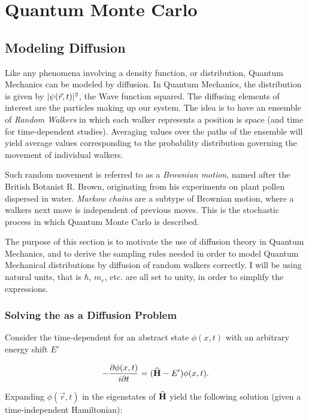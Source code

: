 \chapter{Quantum Monte Carlo}

\section{Modeling Diffusion}

Like any phenomena involving a density function, or distribution, Quantum Mechanics can be modeled by diffusion. In Quantum Mechanics, the distribution is given by $|\psi(\vec r, t)|^2$, the Wave function squared. The diffusing elements of interest are the particles making up our system. The idea is to have an ensemble of \textit{Random Walkers} in which each walker represents a position is space (and time for time-dependent studies). Averaging values over the paths of the ensemble will yield average values corresponding to the probability distribution governing the movement of individual walkers. 

Such random movement is referred to as a \textit{Brownian motion}, named after the British Botanist R. Brown, originating from his experiments on plant pollen dispersed in water. \textit{Markow chains} are a subtype of Brownian motion, where a walkers next move is independent of previous moves. This is the stochastic process in which Quantum Monte Carlo is described.

The purpose of this section is to motivate the use of diffusion theory in Quantum Mechanics, and to derive the sampling rules needed in order to model Quantum Mechanical distributions by diffusion of random walkers correctly. I will be using natural units, that is $\hbar$, $m_e$, etc. are all set to unity, in order to simplify the expressions.

\subsection{Solving the \schrodinger as a Diffusion Problem}

Consider the time-dependent \schrodinger for an abstract state $\phi(x, t)$ with an arbitrary energy shift $E'$

\begin{equation}
 -\frac{\partial \phi(x, t)}{i\partial t} = ({\bf\widehat{H}} - E')\phi(x, t).
\end{equation}

Expanding $\phi(\vec r, t)$ in the eigenstates of ${\bf\widehat{H}}$ yield the following solution (given a time-independent Hamiltonian):

